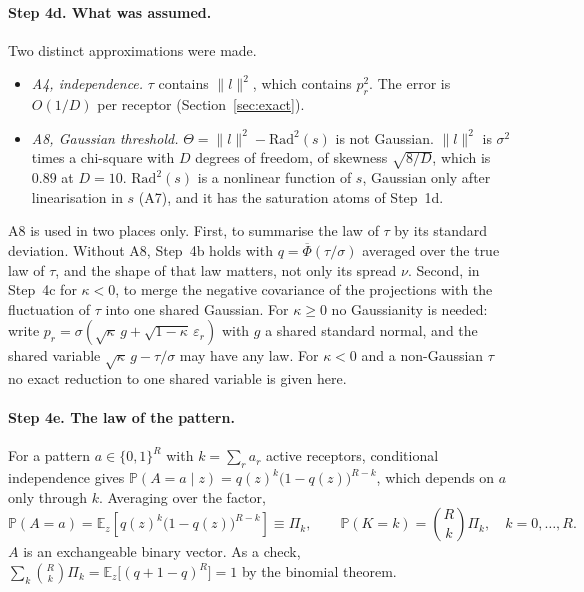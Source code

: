 \documentclass[11pt,a4paper]{article}
\newcommand{\EE}{\mathbb{E}}
\newcommand{\PP}{\mathbb{P}}
\newcommand{\Phibar}{\overline{\Phi}}
\begin{document}
\paragraph{Step 4d. What was assumed.} Two distinct approximations were made.
\begin{itemize}
  \item \emph{A4, independence.} $\tau$ contains $\|l\|^2$, which contains $p_r^2$. The
    error is $O(1/D)$ per receptor (Section~\ref{sec:exact}).
  \item \emph{A8, Gaussian threshold.} $\Theta=\|l\|^2-\mathrm{Rad}^2(s)$ is not
    Gaussian. $\|l\|^2$ is $\sigma^2$ times a chi-square with $D$ degrees of freedom, of
    skewness $\sqrt{8/D}$, which is $0.89$ at $D=10$. $\mathrm{Rad}^2(s)$ is a nonlinear
    function of $s$, Gaussian only after linearisation in $s$ (A7), and it has the
    saturation atoms of Step~1d.
\end{itemize}
A8 is used in two places only. First, to summarise the law of $\tau$ by its standard
deviation. Without A8, Step~4b holds with $q=\Phibar(\tau/\sigma)$ averaged over the true
law of $\tau$, and the shape of that law matters, not only its spread $\nu$. Second, in
Step~4c for $\kappa<0$, to merge the negative covariance of the projections with the
fluctuation of $\tau$ into one shared Gaussian. For $\kappa\ge0$ no Gaussianity is needed:
write $p_r=\sigma(\sqrt\kappa\,g+\sqrt{1-\kappa}\,\varepsilon_r)$ with $g$ a shared
standard normal, and the shared variable $\sqrt\kappa\,g-\tau/\sigma$ may have any law. For
$\kappa<0$ and a non-Gaussian $\tau$ no exact reduction to one shared variable is given
here.

\paragraph{Step 4e. The law of the pattern.} For a pattern $a\in\{0,1\}^R$ with
$k=\sum_r a_r$ active receptors, conditional independence gives
$\PP(A=a\mid z)=q(z)^k\big(1-q(z)\big)^{R-k}$, which depends on $a$ only through $k$.
Averaging over the factor,
\begin{equation}
  \PP(A=a) = \EE_z\!\left[q(z)^k\big(1-q(z)\big)^{R-k}\right] \equiv \Pi_k,
  \qquad
  \PP(K=k) = \binom{R}{k}\Pi_k, \quad k=0,\dots,R.
  \label{eq:PK}
\end{equation}
$A$ is an exchangeable binary vector. As a check,
$\sum_k\binom Rk\Pi_k=\EE_z\big[(q+1-q)^R\big]=1$ by the binomial theorem.
\end{document}
